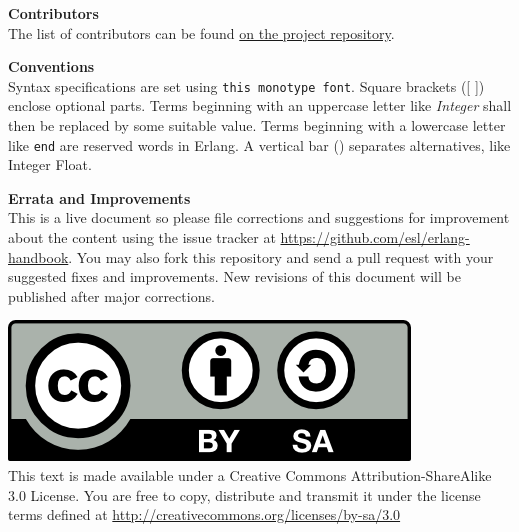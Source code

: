 \documentclass[oneside]{book}
\begin{document}
\textbf{Contributors}\\[0.1\baselineskip]
The list of contributors can be found \href{https://github.com/esl/erlang-handbook/graphs/contributors}{on the project repository}.

\vspace{20pt}
\textbf{Conventions}\\
Syntax specifications are set using \texttt{this monotype font}. Square brackets
([ ]) enclose optional parts. Terms beginning with an uppercase letter like
\textit{Integer} shall then be replaced by some suitable value. Terms beginning
with a lowercase letter like \texttt{end} are reserved words in Erlang. A
vertical bar (\textbar{}) separates alternatives, like Integer \textbar{} Float.

\vspace{20pt}
\textbf{Errata and Improvements}\\
This is a live document so please file corrections and suggestions for
improvement about the content using the issue tracker at
\url{https://github.com/esl/erlang-handbook}. You may also fork this repository
and send a pull request with your suggested fixes and improvements. New
revisions of this document will be published after major corrections.

\vspace{20pt}
\includegraphics[scale=0.7]{includes/cc-by-sa.png}\\ This text is made available
under a Creative Commons Attribution-ShareAlike 3.0 License. You are free to
copy, distribute and transmit it under the license terms defined at
\url{http://creativecommons.org/licenses/by-sa/3.0}

\newpage


\tableofcontents


























\end{document}
